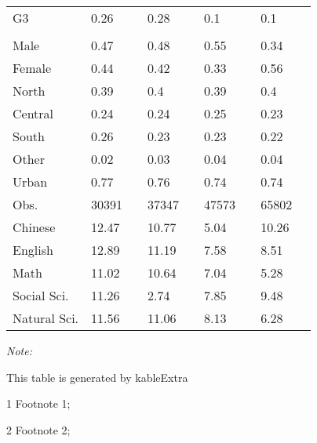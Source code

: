 \begin{table}
\begin{threeparttable}
\begin{tabular}[t]{lllllllll}
\hspace{1em}G3 & 0.26 &  & 0.28 &  & 0.1 &  & 0.1 & \\
\addlinespace[0.3em]
\multicolumn{9}{l}{\textit{\textbf{Panel D: Demographic}}}\\
\hspace{1em}Male & 0.47 &  & 0.48 &  & 0.55 &  & 0.34 & \\
\hspace{1em}Female & 0.44 &  & 0.42 &  & 0.33 &  & 0.56 & \\
\hspace{1em}North & 0.39 &  & 0.4 &  & 0.39 &  & 0.4 & \\
\hspace{1em}Central & 0.24 &  & 0.24 &  & 0.25 &  & 0.23 & \\
\hspace{1em}South & 0.26 &  & 0.23 &  & 0.23 &  & 0.22 & \\
\hspace{1em}Other & 0.02 &  & 0.03 &  & 0.04 &  & 0.04 & \\
\hspace{1em}Urban & 0.77 &  & 0.76 &  & 0.74 &  & 0.74 & \\
Obs. & 30391 &  & 37347 &  & 47573 &  & 65802 & \\
Chinese & 12.47 &  & 10.77 &  & 5.04 &  & 10.26 & \\
English & 12.89 &  & 11.19 &  & 7.58 &  & 8.51 & \\
Math & 11.02 &  & 10.64 &  & 7.04 &  & 5.28 & \\
Social Sci. & 11.26 &  & 2.74 &  & 7.85 &  & 9.48 & \\
Natural Sci. & 11.56 &  & 11.06 &  & 8.13 &  & 6.28 & \\
\bottomrule
\end{tabular}
\begin{tablenotes}
\item \textit{Note: } 
\item This table is generated by kableExtra
\item[1] Footnote 1; 
\item[2] Footnote 2; 
\end{tablenotes}
\end{threeparttable}
\end{table}
